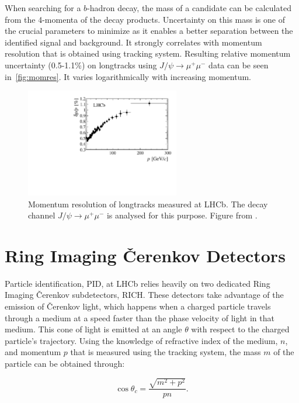 When searching for a $b$-hadron decay, the mass of a candidate can be calculated from the 4-momenta of the decay products. Uncertainty on this mass is one of the crucial parameters to minimize as it enables a better separation between the identified signal and background. It strongly correlates with momentum resolution that is obtained using tracking system. Resulting relative momentum uncertainty (0.5-1.1\%) on \gls{longtrack}s using $J/\psi \rightarrow \mu^{+} \mu^{-}$ data can be seen in~\autoref{fig:momres}. It varies logarithmically with increasing momentum.


\begin{figure}[!h]
	\centering
	\includegraphics[width = 0.6\textwidth]{figs/detector/Fig17.pdf}
	\caption{Momentum resolution of \gls{longtrack}s measured at \gls{LHCb}. The decay channel $J/\psi \rightarrow \mu^{+} \mu^{-}$ is analysed for this purpose. Figure from \cite{LHCb-DP-2014-002}.}
	\label{fig:momres}
\end{figure}

\section{Ring Imaging \v{C}erenkov Detectors}
\label{richsec}
Particle identification, \Gls{PID}, at \Gls{LHCb} relies heavily on two dedicated Ring Imaging \v{C}erenkov subdetectors, \gls{RICH}. These detectors take advantage of the emission of \v{C}erenkov light, which happens when a charged particle travels through a medium at a speed faster than the phase velocity of light in that medium. This cone of light is emitted at an angle $\theta$ with respect to the charged particle's trajectory. Using the knowledge of refractive index of the medium, $n$, and momentum $p$ that is measured using the tracking system, the mass $m$ of the particle can be obtained through:

\begin{equation}
	\cos\theta_{c} =  \frac{\sqrt{m^{2} + p^{2}}}{pn}.
\end{equation}

